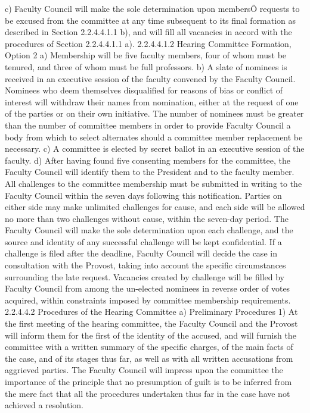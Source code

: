 \documentclass[letterpaper, 11pt]{article}
\begin{document}
c) Faculty Council will make the sole determination upon membersÕ requests to be excused from the committee at any time subsequent to its final formation as described in Section 2.2.4.4.1.1 b), and will fill all vacancies in accord with the procedures of Section 2.2.4.4.1.1 a).
2.2.4.4.1.2 Hearing Committee Formation, Option 2
a) Membership will be five faculty members, four of whom must be tenured, and three of whom must be full professors.
b) A slate of nominees is received in an executive session of the faculty convened by the Faculty Council.  Nominees who deem themselves disqualified for reasons of bias or conflict of interest will withdraw their names from nomination, either at the request of one of the parties or on their own initiative.  The number of nominees must be greater than the number of committee members in order to provide Faculty Council a body from which to select alternates should a committee member replacement be necessary.
c) A committee is elected by secret ballot in an executive session of the faculty.
d) After having found five consenting members for the committee, the Faculty Council will identify them to the President and to the faculty member.  All challenges to the committee membership must be submitted in writing to the Faculty Council within the seven days following this notification.  Parties on either side may make unlimited challenges for cause, and each side will be allowed no more than two challenges without cause, within the seven-day period.  The Faculty Council will make the sole determination upon each challenge, and the source and identity of any successful challenge will be kept confidential.  If a challenge is filed after the deadline, Faculty Council will decide the case in consultation with the Provost, taking into account the specific circumstances surrounding the late request.  Vacancies created by challenge will be filled by Faculty Council from among the un-elected nominees in reverse order of votes acquired, within constraints imposed by committee membership requirements.
2.2.4.4.2 Procedures of the Hearing Committee
a) Preliminary Procedures
1) At the first meeting of the hearing committee, the Faculty Council and the Provost will inform them for the first of the identity of the accused, and will furnish the committee with a written summary of the specific charges, of the main facts of the case, and of its stages thus far, as well as with all written accusations from aggrieved parties. The Faculty Council will impress upon the committee the importance of the principle that no presumption of guilt is to be inferred from the mere fact that all the procedures undertaken thus far in the case have not achieved a resolution.
\end{document}
